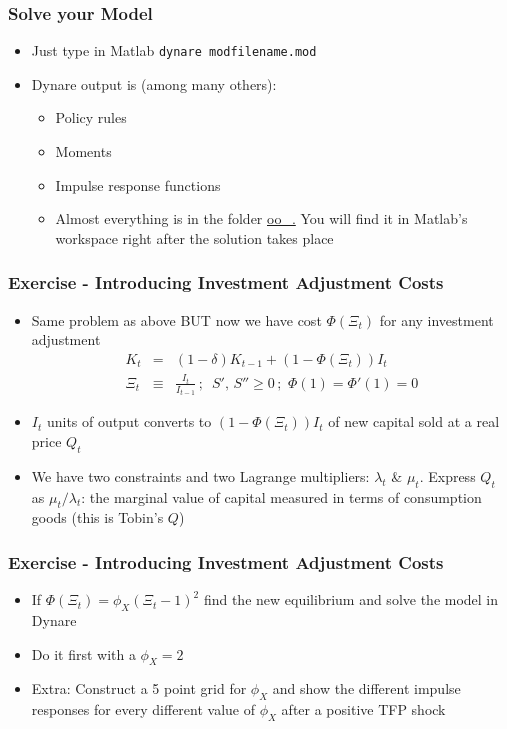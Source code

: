 \documentclass[xcolor=dvipsnames,handout,aspectratio=169]{beamer}
\begin{document}
\begin{frame}[t]\frametitle{\textbf{Solve your Model}}
  \begin{itemize}
  \setlength\itemsep{1em}
  \item Just type in Matlab \texttt{dynare modfilename.mod} 
  \item Dynare output is (among many others):
  \begin{itemize}
      \setlength\itemsep{1em}
    \item Policy rules
    \item Moments 
    \item Impulse response functions
    \item Almost everything is in the folder  \url{oo\_.} You will find it in Matlab's workspace right after the solution takes place
  \end{itemize}
 \end{itemize}
\end{frame}

\begin{frame}[t]\frametitle{\textbf{Exercise - Introducing Investment Adjustment Costs}}
  \begin{itemize}
  \setlength\itemsep{1em}
  \item Same problem as above BUT now we have cost $\Phi(\Xi_t)$ for any investment adjustment 
\begin{eqnarray}  \nonumber 
K_{t}&=&(1-\delta) K_{t-1}+(1-\Phi(\Xi_t))I_t\,\\ \nonumber 
\Xi_t&\equiv&\frac{I_t}{I_{t-1}}\,; \,\,\, S',\, S'' \ge
0\,;\,\,\Phi(1)=\Phi'(1)=0 \label{Kaccum1}
 \end{eqnarray}
\item $I_t$ units of output converts to $(1-\Phi(\Xi_t))I_t$ of new capital sold at a real price $Q_t$ 
\item We have two constraints and two Lagrange multipliers: $\lambda_t$ \& $\mu_t$. Express $Q_t$ as $\mu_t/\lambda_t$: the marginal value of capital measured in terms of consumption goods (this is Tobin's $Q$)
 \end{itemize}
\end{frame}

\begin{frame}[t]\frametitle{\textbf{Exercise - Introducing Investment Adjustment Costs}}
  \begin{itemize}
\item If  $\Phi(\Xi_t)=\phi_X (\Xi_t-1)^2$ find the new equilibrium and solve the model in Dynare
\item Do it first with a $\phi_X = 2$
\item Extra: Construct a 5 point grid for $\phi_X$ and show the different impulse responses for every different value of $\phi_X$ after a positive TFP shock
 \end{itemize}
\end{frame}






 
\end{document}
